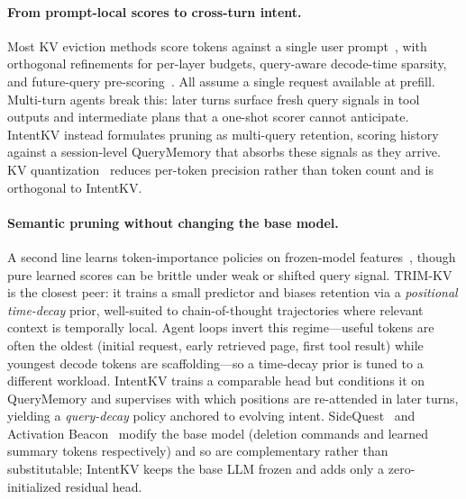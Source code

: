 \documentclass[11pt]{article}
\newcommand{\method}{IntentKV\xspace}
\begin{document}
\paragraph{From prompt-local scores to cross-turn intent.}
Most KV eviction methods score tokens against a single user
prompt~\citep{xiao2024efficient,liu2023scissorhands,zhang2023h2o,li2024snapkv,zhou2024dynamickv,ahn2026lookaheadkv},
with orthogonal refinements for per-layer budgets, query-aware
decode-time sparsity, and future-query
pre-scoring~\citep{ge2024model,cai2024pyramidkv,tang2024quest,devoto2025expected}. All assume a single
request available at prefill. Multi-turn agents break this: later
turns surface fresh query signals in tool outputs and intermediate
plans that a one-shot scorer cannot anticipate. \method instead
formulates pruning as multi-query retention, scoring history against
a session-level QueryMemory that absorbs these signals as they
arrive. KV quantization~\citep{liu2024kivi,kang2024gear} reduces per-token precision
rather than token count and is orthogonal to \method.

\paragraph{Semantic pruning without changing the base model.}
A second line learns token-importance policies on frozen-model
features~\citep{ahn2026lookaheadkv,zhou2024dynamickv}, though pure learned scores can
be brittle under weak or shifted query signal.
TRIM-KV~\citep{bui2025cache} is the closest peer: it trains a small
predictor and biases retention via a \emph{positional time-decay}
prior, well-suited to chain-of-thought trajectories where relevant
context is temporally local. Agent loops invert this regime---useful
tokens are often the oldest (initial request, early retrieved page,
first tool result) while youngest decode tokens are scaffolding---so
a time-decay prior is tuned to a different workload. \method trains a
comparable head but conditions it on QueryMemory and supervises with
which positions are re-attended in later turns, yielding a
\emph{query-decay} policy anchored to evolving intent.
SideQuest~\citep{kariyappa2026sidequest} and Activation Beacon~\citep{zhang2025long}
modify the base model (deletion commands and learned summary tokens
respectively) and so are complementary rather than substitutable;
\method keeps the base LLM frozen and adds only a zero-initialized
residual head.
\end{document}
